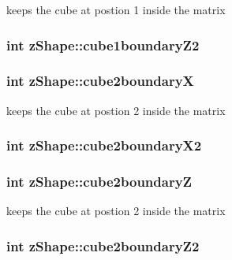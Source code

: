 keeps the cube at postion 1 inside the matrix \hypertarget{classz_shape_aec2d4ff13d10eae9c3b8bca21cbe53a6}{
\subsubsection[{cube1boundary\-Z2}]{\setlength{\rightskip}{0pt plus 5cm}int z\-Shape\-::cube1boundary\-Z2}}\label{classz_shape_aec2d4ff13d10eae9c3b8bca21cbe53a6}
\hypertarget{classz_shape_aadc304ad5e51018cd0217bc6f0a39165}{
\subsubsection[{cube2boundary\-X}]{\setlength{\rightskip}{0pt plus 5cm}int z\-Shape\-::cube2boundary\-X}}\label{classz_shape_aadc304ad5e51018cd0217bc6f0a39165}
keeps the cube at postion 2 inside the matrix \hypertarget{classz_shape_a803a7236cf186faa5ea0ee7c86639ba7}{
\subsubsection[{cube2boundary\-X2}]{\setlength{\rightskip}{0pt plus 5cm}int z\-Shape\-::cube2boundary\-X2}}\label{classz_shape_a803a7236cf186faa5ea0ee7c86639ba7}
\hypertarget{classz_shape_a6e834a60e1cdeef415deae7f9d1af42d}{
\subsubsection[{cube2boundary\-Z}]{\setlength{\rightskip}{0pt plus 5cm}int z\-Shape\-::cube2boundary\-Z}}\label{classz_shape_a6e834a60e1cdeef415deae7f9d1af42d}
keeps the cube at postion 2 inside the matrix \hypertarget{classz_shape_a125d6ca0a1894e10414668fd7d24a74b}{
\subsubsection[{cube2boundary\-Z2}]{\setlength{\rightskip}{0pt plus 5cm}int z\-Shape\-::cube2boundary\-Z2}}\label{classz_shape_a125d6ca0a1894e10414668fd7d24a74b}

